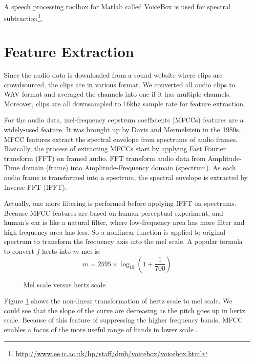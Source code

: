 A speech processing toolbox for Matlab called VoiceBox is used for spectral subtraction\footnote{\url{http://www.ee.ic.ac.uk/hp/staff/dmb/voicebox/voicebox.html}}.

\section{Feature Extraction}
Since the audio data is downloaded from a sound website where clips are crowdsourced, the clips are in various format. 
We converted all audio clips to WAV format and averaged the channels into one if it has multiple channels. 
Moreover, clips are all downsampled to 16khz sample rate for feature extraction. 

For the audio data, mel-frequency cepstrum coefficients (MFCCs) features are a widely-used feature. 
It was brought up by Davis and Mermelstein in the 1980s. 
MFCC features extract the spectral envelope from spectrums of audio frames.
Basically, the process of extracting MFCCs start by applying Fast Fourier transform (FFT) on framed audio. 
FFT transform audio data from Amplitude-Time domain (frame) into Amplitude-Frequency domain (spectrum).  
As each audio frame is transformed into a spectrum, the spectral envelope is extracted by Inverse FFT (IFFT).

Actually, one more filtering is performed before applying IFFT on spectrums. 
Because MFCC features are based on human perceptual experiment, and human's ear is like a natural filter, where low-frequency area has more filter and high-frequency area has less. So a nonlinear function is applied to original spectrum to transform the frequency axis into the mel scale. 
A popular formula to convert $f$ herts into $m$ mel is:  
\begin{equation}
	m = 2595 \times \log_{10}(1+\frac{1}{700})
\end{equation} 

\begin{figure}[htb]
\centering

\caption{Mel scale versus hertz scale}
\label{fig:melscale}
\end{figure}

Figure \ref{fig:melscale} shows the non-linear transformation of hertz scale to mel scale. 
We could see that the slope of the curve are decreasing as the pitch goes up in hertz scale. 
Because of this feature of suppressing the higher frequency bands, MFCC enables a focus of the more useful range of bands in lower scale \cite{davis1980comparison}.

